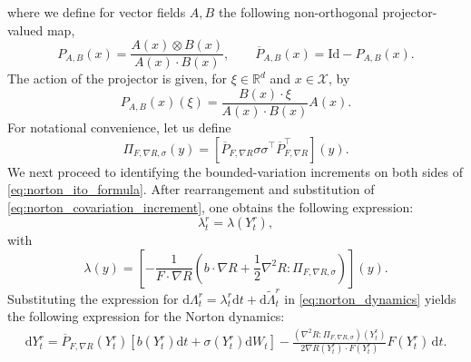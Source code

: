 \documentclass[pdflatex,sn-mathphys]{sn-jnl}%
\theoremstyle{thmstyleone}%
\theoremstyle{thmstyletwo}%
\theoremstyle{thmstylethree}%
\renewcommand{\d}{\mathrm{d}}
\newcommand{\1}{\mathbbm{1}}
\newcommand{\Yr}{Y^r}
\newcommand{\lambdar}{\lambda^r}
\newcommand{\Lambdar}{\Lambda^r}
\begin{document}
where we define for vector fields $A,B$ the following non-orthogonal projector-valued map,
\begin{equation}
    \label{eq:norton_proj_AB}
    P_{A,B}(x) = \frac{A(x) \otimes B(x)}{A(x) \cdot B(x)},\qquad \overline{P}_{A,B}(x)=\mathrm{Id}-P_{A,B}(x).
\end{equation}
The action of the projector is given, for $\xi\in \mathbb{R}^d$ and $x\in\mathcal{X}$, by
\[P_{A,B}(x)(\xi)=\frac{B(x)\cdot \xi}{A(x)\cdot B(x)}A(x).\]
For notational convenience, let us define
\begin{equation}
    \label{eq:norton_covariation_projector_term}
    \Pi_{F,\nabla R,\sigma}(y)=\left[\overline{P}_{F,\nabla R} \sigma\sigma ^\intercal \overline{P}_{ F,\nabla R}^\intercal\right](y).
\end{equation}
We next proceed to identifying the bounded-variation increments on both sides of \eqref{eq:norton_ito_formula}. After rearrangement and substitution of \eqref{eq:norton_covariation_increment}, one obtains the following expression:
\[\lambda_t^r =\lambda(Y_t^r),\]
with
\begin{equation}
    \label{eq:norton_lambda_expr}
    \lambda(y) = \left[-\frac1{F\cdot \nabla R}\left(b\cdot \nabla R +\frac12 \nabla^2 R:\Pi_{F,\nabla R,\sigma}\right)\right](y).
\end{equation}
Substituting the expression for $\d\Lambdar_t = \lambdar_t \d t+ \d \widetilde{\Lambda}^r_t$ in \eqref{eq:norton_dynamics} yields the following expression for the Norton dynamics:
\begin{multline}
    \label{eq:norton_dynamics_solved}
    \d \Yr_t = \overline{P}_{F,\nabla R}(\Yr_t)\left[b(\Yr_t) \d t + \sigma(\Yr_t) \d W_t\right]
    -\frac{\left(\nabla^2 R:\Pi_{F,\nabla R,\sigma}\right)(\Yr_t)}{2\nabla R(\Yr_t)\cdot F(\Yr_t)}F(\Yr_t)\,\d t.
\end{multline}
\end{document}
